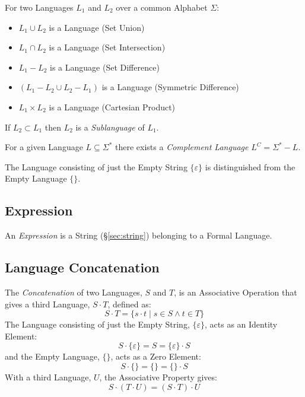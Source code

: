 For two Languages $L_1$ and $L_2$ over a common Alphabet $\Sigma$:
\begin{itemize}
  \item $L_1 \cup L_2$ is a Language (Set Union)
  \item $L_1 \cap L_2$ is a Language (Set Intersection)
  \item $L_1 - L_2$ is a Language (Set Difference)
  \item $(L_1 - L_2 \cup L_2 - L_1)$ is a Language (Symmetric Difference)
  \item $L_1 \times L_2$ is a Language (Cartesian Product)
\end{itemize}
If $L_2 \subset L_1$ then $L_2$ is a \emph{Sublanguage} of $L_1$.

For a given Language $L \subseteq \Sigma^*$ there exists a
\emph{Complement Language} $L^C = \Sigma^* - L$.

The Language consisting of just the Empty String $\{\varepsilon\}$ is
distinguished from the Empty Language $\{\}$.



\subsection{Expression}\label{sec:expression}

An \emph{Expression} is a String (\S\ref{sec:string}) belonging to a
Formal Language.



\subsection{Language Concatenation}\label{sec:language_concatenation}

The \emph{Concatenation} of two Languages, $S$ and $T$, is an
Associative Operation that gives a third Language, $S \cdot T$,
defined as:
\[
  S \cdot T = \{s \cdot t\;|\; s \in S \wedge t \in T\}
\]
The Language consisting of just the Empty String, $\{\varepsilon\}$,
acts as an Identity Element:
\[
  S \cdot \{\varepsilon\} = S = \{\varepsilon\} \cdot S
\]
and the Empty Language, $\{\}$, acts as a Zero Element:
\[
  S \cdot \{\} = \{\} = \{\} \cdot S
\]
With a third Language, $U$, the Associative Property gives:
\[
  S \cdot (T \cdot U) = (S \cdot T) \cdot U
\]



